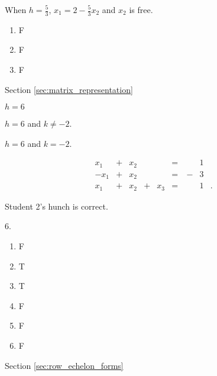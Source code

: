 \begin{multicols}{2}
\item When $h = \frac{5}{3}$, $x_1 =  2-\frac{5}{3}x_2$ and $x_2$ is free. 

\ea

\item %
\begin{enumerate}[label=(\alph*), leftmargin=1\parindent]
	\item F 
	\item F
	\item  F
	\end{enumerate}
		
	
	
	
\oee

\hspace{-0.25in} Section \ref{sec:matrix_representation}

\obe
\item 
	\ba
	\item $h=6$

	\item $h=6$ and $k \neq -2$. 

	\item $h=6$ and $k=-2$. 

	\ea



\item 
\begin{alignat*}{5}
{}x_1 	&{}+{}	&{}x_2	&{}{}		&{}		&{}={}	&\ {}&1&{}\\
{-}x_1	&{}+{}	&{}x_2	&{}{}		&{}		&{}={} 	&\ {-}&3&{} \\
{}x_1		&{}+{}	&{}x_2	&{}+{}	&{}x_3	&{}={}	& \ {}&1&{.}
\end{alignat*}


\item Student 2's hunch is correct. 

\oee

\be
\item [6.]
	\begin{enumerate}[label=(\alph*), leftmargin=1\parindent]
	\item F
	\item T 
	\item T
	\item F 
	\item F
	\item F
	\end{enumerate}
\ee

\hspace{-0.25in} Section \ref{sec:row_echelon_forms}


\end{multicols}

